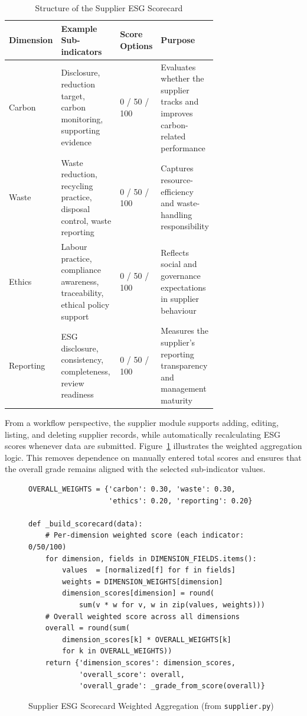 \documentclass[11pt,a4paper]{article}
\begin{document}
\begin{table}[h]
\centering
\scriptsize
\begin{tabularx}{\linewidth}{@{}p{0.15\linewidth}p{0.40\linewidth}p{0.15\linewidth}X@{}}
\toprule
\textbf{Dimension} & \textbf{Example Sub-indicators} & \textbf{Score Options} & \textbf{Purpose} \\
\midrule
Carbon & Disclosure, reduction target, carbon monitoring, supporting evidence & 0 / 50 / 100 & Evaluates whether the supplier tracks and improves carbon-related performance \\
Waste & Waste reduction, recycling practice, disposal control, waste reporting & 0 / 50 / 100 & Captures resource-efficiency and waste-handling responsibility \\
Ethics & Labour practice, compliance awareness, traceability, ethical policy support & 0 / 50 / 100 & Reflects social and governance expectations in supplier behaviour \\
Reporting & ESG disclosure, consistency, completeness, review readiness & 0 / 50 / 100 & Measures the supplier's reporting transparency and management maturity \\
\bottomrule
\end{tabularx}
\caption{Structure of the Supplier ESG Scorecard}
\end{table}

From a workflow perspective, the supplier module supports adding, editing, listing, and deleting supplier records, while automatically recalculating ESG scores whenever data are submitted. Figure~\ref{fig:scorecard} illustrates the weighted aggregation logic. This removes dependence on manually entered total scores and ensures that the overall grade remains aligned with the selected sub-indicator values.

\begin{figure}[h]
\begin{lstlisting}[style=pysnippet]
OVERALL_WEIGHTS = {'carbon': 0.30, 'waste': 0.30,
                   'ethics': 0.20, 'reporting': 0.20}

def _build_scorecard(data):
    # Per-dimension weighted score (each indicator: 0/50/100)
    for dimension, fields in DIMENSION_FIELDS.items():
        values  = [normalized[f] for f in fields]
        weights = DIMENSION_WEIGHTS[dimension]
        dimension_scores[dimension] = round(
            sum(v * w for v, w in zip(values, weights)))
    # Overall weighted score across all dimensions
    overall = round(sum(
        dimension_scores[k] * OVERALL_WEIGHTS[k]
        for k in OVERALL_WEIGHTS))
    return {'dimension_scores': dimension_scores,
            'overall_score': overall,
            'overall_grade': _grade_from_score(overall)}
\end{lstlisting}
\caption{Supplier ESG Scorecard Weighted Aggregation (from \texttt{supplier.py})}
\label{fig:scorecard}
\end{figure}
\end{document}
